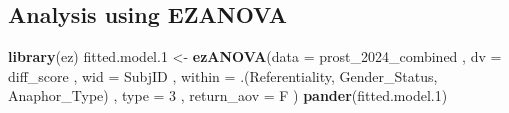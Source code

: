 \documentclass[
  10pt,
]{article}
\newenvironment{Shaded}{\begin{snugshade}}{\end{snugshade}}
\newcommand{\AttributeTok}[1]{\textcolor[rgb]{0.13,0.29,0.53}{#1}}
\newcommand{\DecValTok}[1]{\textcolor[rgb]{0.00,0.00,0.81}{#1}}
\newcommand{\FloatTok}[1]{\textcolor[rgb]{0.00,0.00,0.81}{#1}}
\newcommand{\FunctionTok}[1]{\textcolor[rgb]{0.13,0.29,0.53}{\textbf{#1}}}
\newcommand{\NormalTok}[1]{#1}
\newcommand{\OtherTok}[1]{\textcolor[rgb]{0.56,0.35,0.01}{#1}}
\begin{document}
\subsection{Analysis using EZANOVA}\label{analysis-using-ezanova}

\begin{Shaded}
\begin{Highlighting}[]
\FunctionTok{library}\NormalTok{(ez)}
\NormalTok{fitted.model}\FloatTok{.1} \OtherTok{\textless{}{-}} \FunctionTok{ezANOVA}\NormalTok{(}\AttributeTok{data =}\NormalTok{ prost\_2024\_combined}
\NormalTok{              , }\AttributeTok{dv =}\NormalTok{ diff\_score}
\NormalTok{              , }\AttributeTok{wid =}\NormalTok{ SubjID}
\NormalTok{              , }\AttributeTok{within =}\NormalTok{ .(Referentiality, Gender\_Status, Anaphor\_Type)}
\NormalTok{              , }\AttributeTok{type =} \DecValTok{3}
\NormalTok{              , }\AttributeTok{return\_aov =}\NormalTok{ F}
\NormalTok{              )}
\FunctionTok{pander}\NormalTok{(fitted.model}\FloatTok{.1}\NormalTok{)}
\end{Highlighting}
\end{Shaded}
\end{document}
